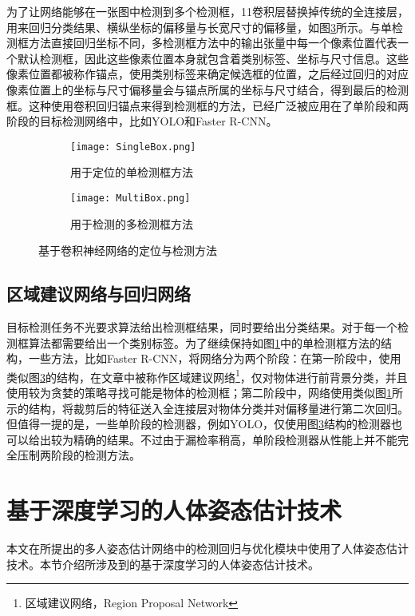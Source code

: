 为了让网络能够在一张图中检测到多个检测框，1\times1卷积层替换掉传统的全连接层，用来回归分类结果、横纵坐标的偏移量与长宽尺寸的偏移量，如图\ref{fig:MultiBox}所示。与单检测框方法直接回归坐标不同，多检测框方法中的输出张量中每一个像素位置代表一个默认检测框，因此这些像素位置本身就包含着类别标签、坐标与尺寸信息。这些像素位置都被称作锚点，使用类别标签来确定候选框的位置，之后经过回归的对应像素位置上的坐标与尺寸偏移量会与锚点所属的坐标与尺寸结合，得到最后的检测框。这种使用卷积回归锚点来得到检测框的方法，已经广泛被应用在了单阶段和两阶段的目标检测网络中，比如YOLO\cite{redmon2016you}和Faster R-CNN\cite{Ren2015Faster}。

\begin{figure}[h]	
	\centering
	\begin{subfigure}[b]{0.3\textwidth}
		\texttt{[image: SingleBox.png]}
		\caption{用于定位的单检测框方法}
		\label{fig:SingleBox}
	\end{subfigure}
	\hskip1.5cm
	\begin{subfigure}[b]{0.3\textwidth}
		\texttt{[image: MultiBox.png]}
		\caption{用于检测的多检测框方法}
		\label{fig:MultiBox}
	\end{subfigure}
	\caption{基于卷积神经网络的定位与检测方法}
\end{figure}

\subsection{区域建议网络与回归网络}
\label{subsec:factsRPNregression}
目标检测任务不光要求算法给出检测框结果，同时要给出分类结果。对于每一个检测框算法都需要给出一个类别标签。为了继续保持如图\ref{fig:SingleBox}中的单检测框方法的结构，一些方法，比如Faster R-CNN\cite{Ren2015Faster}，将网络分为两个阶段：在第一阶段中，使用类似图\ref{fig:MultiBox}的结构，在文章中被称作区域建议网络\footnote{区域建议网络，Region Proposal Network}，仅对物体进行前背景分类，并且使用较为贪婪的策略寻找可能是物体的检测框；第二阶段中，网络使用类似图\ref{fig:SingleBox}所示的结构，将裁剪后的特征送入全连接层对物体分类并对偏移量进行第二次回归。但值得一提的是，一些单阶段的检测器，例如YOLO\cite{redmon2016you}，仅使用图\ref{fig:MultiBox}结构的检测器也可以给出较为精确的结果。不过由于漏检率稍高，单阶段检测器从性能上并不能完全压制两阶段的检测方法。

\section{基于深度学习的人体姿态估计技术}
\label{sec:factspose}
本文在所提出的多人姿态估计网络中的检测回归与优化模块中使用了人体姿态估计技术。本节介绍所涉及到的基于深度学习的人体姿态估计技术。


